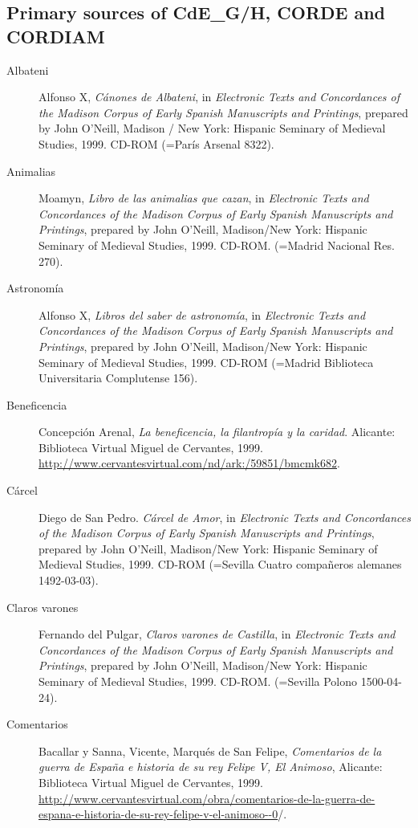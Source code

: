 \begin{flushleft}
\begin{description}
\end{description}

\subsection*{Primary sources of CdE\_G/H, CORDE and CORDIAM} \label{sec:7.2.2}

\begin{description}
\item[Albateni]Alfonso X, \textit{Cánones de Albateni}, in \textit{Electronic Texts and Concordances of the Madison Corpus of Early Spanish Manuscripts and Printings}, prepared by John O’Neill, Madison / New York: Hispanic Seminary of Medieval Studies, 1999. CD-ROM (=París Arsenal 8322).
\item[Animalias]Moamyn, \textit{Libro de las animalias que cazan}, in \textit{Electronic Texts and Concordances of the Madison Corpus of Early Spanish Manuscripts and Printings}, prepared by John O’Neill, Madison/New York: Hispanic Seminary of Medieval Studies, 1999. CD-ROM. (=Madrid Nacional Res. 270).
\item[Astronomía]Alfonso X, \textit{Libros del saber de astronomía}, in \textit{Electronic Texts and Concordances of the Madison Corpus of Early Spanish Manuscripts and Printings}, prepared by John O’Neill, Madison/New York: Hispanic Seminary of Medieval Studies, 1999. CD-ROM (=Madrid Biblioteca Universitaria Complutense 156).
\item[Beneficencia]Concepción Arenal, \textit{La beneficencia, la filantropía y la caridad}. Alicante: Biblioteca Virtual Miguel de Cervantes, 1999. \url{http://www.cervantesvirtual.com/nd/ark:/59851/bmcmk682}.
\item[Cárcel]Diego de San Pedro. \textit{Cárcel de Amor}, in \textit{Electronic Texts and Concordances of the Madison Corpus of Early Spanish Manuscripts and Printings}, prepared by John O’Neill, Madison/New York: Hispanic Seminary of Medieval Studies, 1999. CD-ROM (=Sevilla Cuatro compañeros alemanes 1492-03-03).
\item[Claros varones]Fernando del Pulgar, \textit{Claros varones de Castilla}, in \textit{Electronic Texts and Concordances of the Madison Corpus of Early Spanish Manuscripts and Printings}, prepared by John O’Neill, Madison/New York: Hispanic Seminary of Medieval Studies, 1999. CD-ROM. (=Sevilla Polono 1500-04-24).
\item[Comentarios]Bacallar y Sanna, Vicente, Marqués de San Felipe, \textit{Comentarios de la guerra de España e historia de su rey Felipe V, El Animoso}, Alicante: Biblioteca Virtual Miguel de Cervantes, 1999. \href{http://www.cervantesvirtual.com/obra/comentarios-de-la-guerra-de-espana-e-historia-de-su-rey-felipe-v-el-animoso--0/}{{http://www.cervantesvirtual.com/obra/comentarios-de-la-guerra-de-espana-e-historia-de-su-rey-felipe-v-el-animoso-{}-0}}/.

\end{description}
\end{flushleft}
